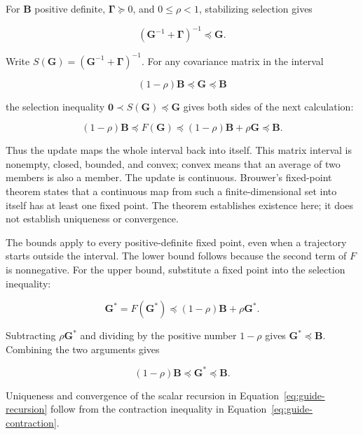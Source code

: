 \documentclass[11pt]{article}
\newcommand{\mat}[1]{\mathbf{#1}}
\newcommand{\bGamma}{\boldsymbol{\Gamma}}
\begin{document}
For $\mat B$ positive definite, $\bGamma\succeq0$, and
$0\leq\rho<1$, stabilizing selection gives

\begin{equation}
(\mat G^{-1}+\bGamma)^{-1}\preceq\mat G.
\end{equation}

Write $S(\mat G)=(\mat G^{-1}+\bGamma)^{-1}$.  For any covariance matrix in
the interval

\begin{equation}
(1-\rho)\mat B\preceq\mat G\preceq\mat B
\end{equation}

the selection inequality $\mat0\prec S(\mat G)\preceq\mat G$ gives both
sides of the next calculation:

\begin{equation}
(1-\rho)\mat B
\preceq F(\mat G)
\preceq(1-\rho)\mat B+\rho\mat G
\preceq\mat B.
\label{eq:guide-matrix-interval-map}
\end{equation}

Thus the update maps the whole interval back into itself.  This matrix
interval is nonempty, closed, bounded, and convex; convex means that an average
of two members is also a member.  The update is continuous.  Brouwer's
fixed-point theorem states that a continuous map from such a
finite-dimensional set into itself has at least one fixed point.  The theorem
establishes existence here; it does not establish uniqueness or convergence.

The bounds apply to every positive-definite fixed point, even when a trajectory
starts outside the interval.  The lower bound follows because the second term
of $F$ is nonnegative.  For the upper bound, substitute a fixed point into the
selection inequality:

\begin{equation}
\mat G^*=F(\mat G^*)
\preceq(1-\rho)\mat B+\rho\mat G^*.
\end{equation}

Subtracting $\rho\mat G^*$ and dividing by the positive number $1-\rho$
gives $\mat G^*\preceq\mat B$.  Combining the two arguments gives

\begin{equation}
(1-\rho)\mat B\preceq\mat G^*\preceq\mat B.
\end{equation}

Uniqueness and convergence of the scalar recursion in Equation~\eqref{eq:guide-recursion} follow from the contraction inequality in Equation~\eqref{eq:guide-contraction}.
\end{document}
